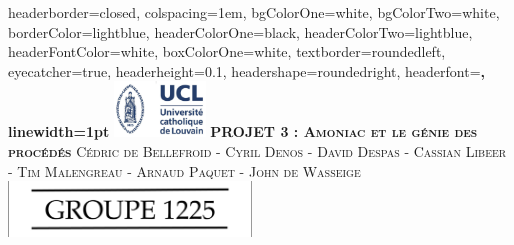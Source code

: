 \documentclass[landscape,a0paper,fontscale=0.285]{baposter} %
\begin{document}
\begin{poster}
{
headerborder=closed, %
colspacing=1em, %
bgColorOne=white, %
bgColorTwo=white, %
borderColor=lightblue, %
headerColorOne=black, %
headerColorTwo=lightblue, %
headerFontColor=white, %
boxColorOne=white, %
textborder=roundedleft, %
eyecatcher=true, %
headerheight=0.1\textheight, %
headershape=roundedright, %
headerfont=\Large\bf\textsc, %
linewidth=1pt %
}
%
{\includegraphics[height=4em]{UCL.jpg}} %
{\bf\textsc{PROJET 3 : Amoniac et le g\'enie des proc\'ed\'es}\vspace{0.5em}} %
{\textsc{\small Cédric de Bellefroid - Cyril Denos - David Despas  - Cassian Libeer  - Tim Malengreau - Arnaud Paquet - John de Wasseige}} %
{\includegraphics[height=4em]{groupe.png}} %



\end{poster}
\end{document}
